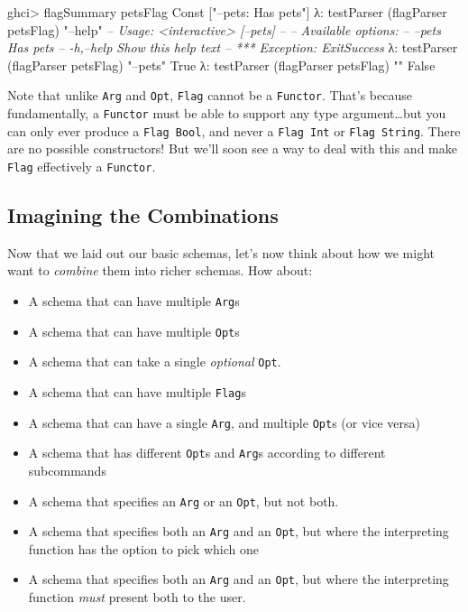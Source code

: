 \documentclass[]{article}
\newenvironment{Shaded}{}{}
\newcommand{\CommentTok}[1]{\textcolor[rgb]{0.38,0.63,0.69}{\textit{#1}}}
\newcommand{\DataTypeTok}[1]{\textcolor[rgb]{0.56,0.13,0.00}{#1}}
\newcommand{\NormalTok}[1]{#1}
\newcommand{\OperatorTok}[1]{\textcolor[rgb]{0.40,0.40,0.40}{#1}}
\newcommand{\StringTok}[1]{\textcolor[rgb]{0.25,0.44,0.63}{#1}}
\begin{document}
\begin{Shaded}
\begin{Highlighting}[]
\NormalTok{ghci}\OperatorTok{>}\NormalTok{ flagSummary petsFlag}
\DataTypeTok{Const}\NormalTok{ [}\StringTok{"--pets: Has pets"}\NormalTok{]}
\NormalTok{λ}\OperatorTok{:}\NormalTok{ testParser (flagParser petsFlag) }\StringTok{"--help"}
\CommentTok{-- Usage: <interactive> [--pets]}
\CommentTok{-- }
\CommentTok{-- Available options:}
\CommentTok{--   --pets                   Has pets}
\CommentTok{--   -h,--help                Show this help text}
\CommentTok{-- *** Exception: ExitSuccess}
\NormalTok{λ}\OperatorTok{:}\NormalTok{ testParser (flagParser petsFlag) }\StringTok{"--pets"}
\DataTypeTok{True}
\NormalTok{λ}\OperatorTok{:}\NormalTok{ testParser (flagParser petsFlag) }\StringTok{""}
\DataTypeTok{False}
\end{Highlighting}
\end{Shaded}

Note that unlike \texttt{Arg} and \texttt{Opt}, \texttt{Flag} cannot be a
\texttt{Functor}. That's because fundamentally, a \texttt{Functor} must be able
to support any type argument\ldots but you can only ever produce a
\texttt{Flag\ Bool}, and never a \texttt{Flag\ Int} or \texttt{Flag\ String}.
There are no possible constructors! But we'll soon see a way to deal with this
and make \texttt{Flag} effectively a \texttt{Functor}.

\hypertarget{imagining-the-combinations}{%
\subsection{Imagining the Combinations}\label{imagining-the-combinations}}

Now that we laid out our basic schemas, let's now think about how we might want
to \emph{combine} them into richer schemas. How about:

\begin{itemize}
\tightlist
\item
  A schema that can have multiple \texttt{Arg}s
\item
  A schema that can have multiple \texttt{Opt}s
\item
  A schema that can take a single \emph{optional} \texttt{Opt}.
\item
  A schema that can have multiple \texttt{Flag}s
\item
  A schema that can have a single \texttt{Arg}, and multiple \texttt{Opt}s (or
  vice versa)
\item
  A schema that has different \texttt{Opt}s and \texttt{Arg}s according to
  different subcommands
\item
  A schema that specifies an \texttt{Arg} or an \texttt{Opt}, but not both.
\item
  A schema that specifies both an \texttt{Arg} and an \texttt{Opt}, but where
  the interpreting function has the option to pick which one
\item
  A schema that specifies both an \texttt{Arg} and an \texttt{Opt}, but where
  the interpreting function \emph{must} present both to the user.
\end{itemize}
\end{document}
